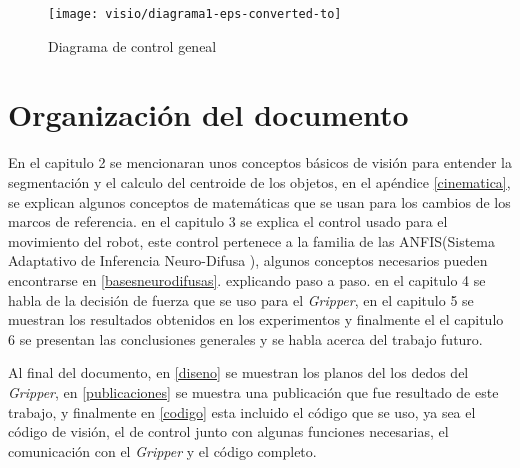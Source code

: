 \begin{figure}[h]
	\centering
	\texttt{[image: visio/diagrama1-eps-converted-to]}
	\caption{Diagrama de control geneal}
	\label{fig:diagrama1-eps-converted-to}
\end{figure}

\section{Organización del documento}


En el capitulo 2 se mencionaran unos conceptos básicos de visión para entender la segmentación y el calculo del centroide de los objetos, en el apéndice \cref{cinematica}, se explican algunos conceptos de matemáticas que se usan para los cambios de los marcos de referencia. en el capitulo 3 se explica el control usado para el movimiento del robot, este control pertenece a la familia de las ANFIS(Sistema Adaptativo de Inferencia Neuro-Difusa ), algunos conceptos necesarios pueden encontrarse en \cref{basesneurodifusas}. explicando paso a paso. en el capitulo 4 se habla de la decisión de fuerza que se uso para el \textit{Gripper}, 
en el capitulo 5 se muestran los resultados obtenidos en los experimentos y finalmente el el capitulo 6 se presentan las conclusiones generales y se habla acerca del trabajo futuro.

Al final del documento, en \cref{diseno} se muestran los planos del los dedos del \textit{Gripper}, en \cref{publicaciones} se muestra una publicación que fue resultado de este trabajo, y finalmente en \cref{codigo} esta incluido el código que se uso, ya sea el código de visión, el de control junto con algunas funciones necesarias, el comunicación con el \textit{Gripper} y el código completo.


